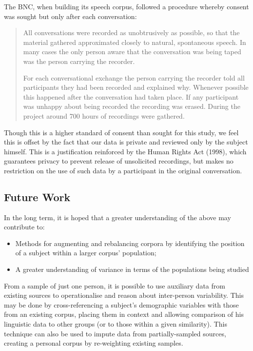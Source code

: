 The BNC, when building its speech corpus, followed a procedure whereby consent was sought but only after each conversation\cite[p. 21]{lou1995users}:
\begin{quote}
All conversations were recorded as unobtrusively as possible, so that the material gathered approximated closely to natural, spontaneous speech. In many cases the only person aware that the conversation was being taped was the person carrying the recorder.

For each conversational exchange the person carrying the recorder told all participants they had been recorded and explained why. Whenever possible this happened after the conversation had taken place. If any participant was unhappy about being recorded the recording was erased. During the project around 700 hours of recordings were gathered.
\end{quote}

Though this is a higher standard of consent than sought for this study, we feel this is offset by the fact that our data is private and  reviewed only by the subject himself.  This is a justification reinforced by the Human Rights Act (1998), which guarantees privacy to prevent release of unsolicited recordings, but makes no restriction on the use of such data by a participant in the original conversation.



\subsection{Future Work}

In the long term, it is hoped that a greater understanding of the above may contribute to:

\begin{itemize}
    \item Methods for augmenting and rebalancing corpora by identifying the position of a subject within a larger corpus' population;
    \item A greater understanding of variance in terms of the populations being studied
\end{itemize}

From a sample of just one person, it is possible to use auxiliary data from existing sources to operationalise and reason about inter-person variability.  This may be done by cross-referencing a subject's demographic variables with those from an existing corpus, placing them in context and allowing comparison of his linguistic data to other groups (or to those within a given similarity). This technique can also be used to impute data from partially-sampled sources, creating a personal corpus by re-weighting existing samples.

